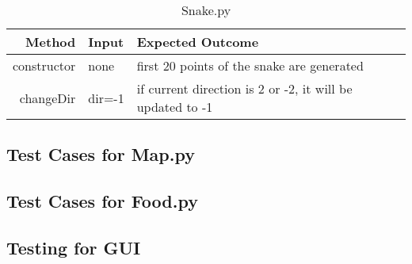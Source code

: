 \documentclass[12pt]{article}
\begin{document}
\begin{center}
	\begin{longtable}{ | r | p{4cm} | p{4cm} | p{4cm} |}
	\caption{Snake.py} \\ \hline \label{TblInputVar} 
	Method & Input & Expected Outcome\\ \hline
	constructor & none &  first 20 points of the snake are generated\\ \hline
	changeDir & dir=-1 & if current direction is 2 or -2, it will be updated to -1\\ \hline
	\end{longtable}
\end{center}




\subsection{Test Cases for Map.py}
\subsection{Test Cases for Food.py}
\subsection{Testing for GUI}




\end{document}
